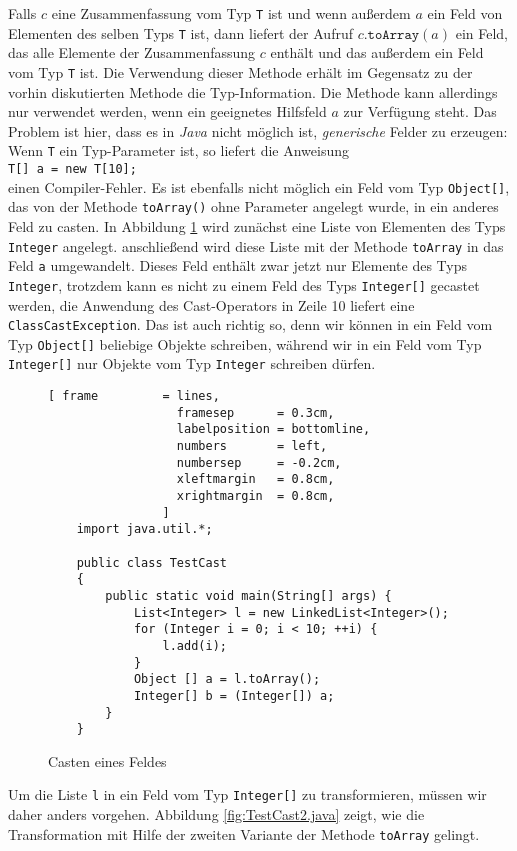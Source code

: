 \begin{enumerate}
      Falls $c$ eine Zusammenfassung vom Typ \texttt{T} ist und wenn au{\ss}erdem $a$ ein Feld
      von Elementen des selben Typs \texttt{T} ist, dann liefert der Aufruf
      $c.\mathtt{toArray}(a)$ ein Feld, das alle Elemente der Zusammenfassung $c$ enth\"alt
      und das au{\ss}erdem ein Feld vom Typ \texttt{T} ist.
      Die Verwendung dieser Methode erh\"alt im Gegensatz zu der vorhin diskutierten Methode
      die Typ-Information.  Die Methode kann allerdings nur verwendet werden, wenn ein
      geeignetes Hilfsfeld $a$ zur Verf\"ugung steht.  Das Problem ist hier, dass es in
      \textsl{Java} nicht m\"oglich ist, \emph{generische} Felder zu erzeugen:  Wenn
      \texttt{T} ein Typ-Parameter ist, so liefert die Anweisung
      \\[0.2cm]
      \hspace*{1.3cm}
      \texttt{T[] a = new T[10];}
      \\[0.2cm]
      einen Compiler-Fehler.  Es ist ebenfalls nicht m\"oglich ein Feld vom Typ
      \texttt{Object[]}, das von der Methode \texttt{toArray()} ohne Parameter angelegt
      wurde, in ein anderes Feld zu casten.  In Abbildung \ref{fig:TestCast.java}
      wird zun\"achst eine Liste von Elementen des Typs \texttt{Integer} angelegt.
      anschlie{\ss}end wird diese Liste mit der Methode \texttt{toArray} in das Feld \texttt{a}
      umgewandelt.   Dieses Feld enth\"alt zwar jetzt nur Elemente des Typs
      \texttt{Integer}, trotzdem kann es nicht zu einem Feld des Typs \texttt{Integer[]}
      gecastet werden, die Anwendung des Cast-Operators in Zeile 10 liefert
      eine \texttt{ClassCastException}.  Das ist auch richtig so, denn wir k\"onnen
      in ein Feld vom Typ \texttt{Object[]} beliebige Objekte schreiben, w\"ahrend wir in ein
      Feld vom Typ \texttt{Integer[]} nur Objekte vom Typ \texttt{Integer} schreiben
      d\"urfen.


      \begin{figure}[!h]
\centering
\begin{Verbatim}[ frame         = lines, 
                  framesep      = 0.3cm, 
                  labelposition = bottomline,
                  numbers       = left,
                  numbersep     = -0.2cm,
                  xleftmargin   = 0.8cm,
                  xrightmargin  = 0.8cm,
                ]
    import java.util.*;
    
    public class TestCast 
    { 
        public static void main(String[] args) {
            List<Integer> l = new LinkedList<Integer>();
            for (Integer i = 0; i < 10; ++i) {
                l.add(i);
            }
            Object [] a = l.toArray();
            Integer[] b = (Integer[]) a;
        }
    }
\end{Verbatim}
\vspace*{-0.3cm}
\caption{Casten eines Feldes}
\label{fig:TestCast.java}
\end{figure}
      Um die Liste \texttt{l} in ein Feld vom Typ \texttt{Integer[]} zu transformieren,
      m\"ussen wir daher anders vorgehen.  Abbildung \ref{fig:TestCast2.java}
      zeigt, wie die Transformation mit Hilfe der zweiten Variante der Methode
      \texttt{toArray} gelingt.


\end{enumerate}
